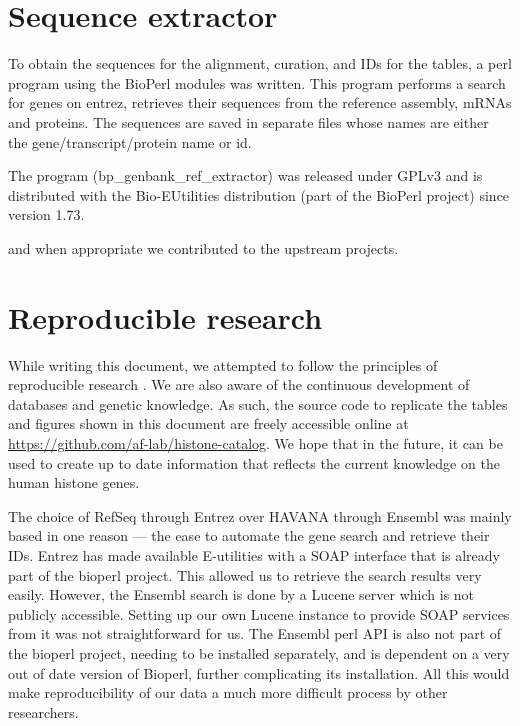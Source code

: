 \documentclass[10pt,a4paper,twocolumn,article]{memoir}
\begin{document}
  \section{Sequence extractor}
    To obtain the sequences for the alignment, curation, and IDs for the tables, a perl program using the
    BioPerl modules was written. This program performs a search for genes on entrez, retrieves
    their sequences from the reference assembly, mRNAs and proteins. The sequences are saved in separate files whose
    names are either the gene/transcript/protein name or id.

    The program (bp\_genbank\_ref\_extractor) was released under GPLv3 and is distributed with
    the Bio-EUtilities distribution (part of the BioPerl project) since version 1.73.


    and when appropriate we contributed to the upstream projects.




  \section{Reproducible research}
  \label{sec:reproducible}
    While writing this document, we attempted to follow the principles of reproducible research
    \citep{reproducible-research-bioinformatics, reproducible-research-law}.
    We are also aware of the continuous development of databases and genetic knowledge. As such,
    the source code to replicate the tables and figures shown in this document are freely accessible
    online at \url{https://github.com/af-lab/histone-catalog}. We hope that in the future, it can
    be used to create up to date information
    that reflects the current knowledge on the human histone genes.

    The choice of RefSeq through Entrez over HAVANA through Ensembl was mainly based in one reason --- the ease
    to automate the gene search and retrieve their IDs. Entrez has made available E-utilities with a SOAP interface
    that is already part of the bioperl project. This allowed us to retrieve the search results very easily.
    However, the Ensembl search is done by a Lucene server which is not publicly accessible. Setting up our own
    Lucene instance to provide SOAP services from it was not straightforward for us. The Ensembl perl API is
    also not part of the bioperl project, needing to be installed separately, and is dependent on a very
    out of date version of Bioperl, further complicating its installation. All this would make reproducibility
    of our data a much more difficult process by other researchers.
\end{document}
